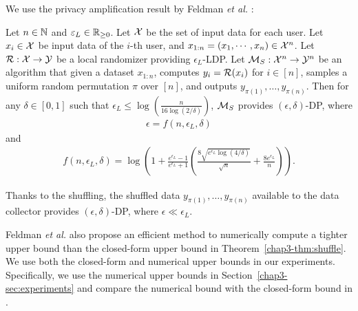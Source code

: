 We use the privacy amplification result by Feldman \textit{et al.} \cite{Feldman_FOCS21}:
\begin{theorem}  \label{chap3-thm:shuffle}
Let $n \in \mathbb{N}$ and $\varepsilon_L \in \mathbb{R}_{\ge0}$. 
Let $\mathcal{X}$ be the set of input data for each user. 
Let $x_i \in \mathcal{X}$ be input data of the $i$-th user, and 
$x_{1:n} = (x_1, \cdots, x_n) \in \mathcal{X}^n$. 
Let $\mathcal{R}: \mathcal{X} \rightarrow \mathcal{Y}$ be a local randomizer providing $\epsilon_L$-LDP. 
Let $\mathcal{M}_S: \mathcal{X}^n \rightarrow \mathcal{Y}^n$ be an algorithm that given a dataset $x_{1:n}$, computes $y_i = \mathcal{R}(x_i)$ for $i \in [n]$, samples a uniform random permutation $\pi$ over $[n]$, and outputs $y_{\pi(1)}, \ldots, y_{\pi(n)}$. 
Then for any $\delta \in [0,1]$ such that $\epsilon_L \leq \log (\frac{n}{16 \log (2/\delta)})$, $\mathcal{M}_S$ provides $(\epsilon, \delta)$-DP, where
\begin{align}
\epsilon = f(n, \epsilon_L, \delta)
\label{chap3-eq:shuffle_epsilon_f}
\end{align}
and 
\begin{align}
f(n, \epsilon_L, \delta) = \log \left( 1 + \frac{e^{\epsilon_L}-1}{e^{\epsilon_L}+1} \left( \frac{8\sqrt{e^{\epsilon_L} \log(4/\delta)}}{\sqrt{n}} + \frac{8 e^{\epsilon_L}}{n} \right) \right).
\label{chap3-eq:shuffle_epsilon}
\end{align}
\end{theorem}
Thanks to the shuffling, the shuffled data $y_{\pi(1)}, \ldots, y_{\pi(n)}$ available to the data collector provides $(\epsilon, \delta)$-DP, where $\epsilon \ll \epsilon_L$. 

Feldman \textit{et al.} \cite{Feldman_FOCS21} also propose an efficient method to numerically compute a tighter upper bound than the closed-form upper bound in Theorem~\ref{chap3-thm:shuffle}. 
We use both the closed-form and numerical upper bounds in our experiments. 
Specifically, we use the numerical upper bounds in Section~\ref{chap3-sec:experiments} and compare the numerical bound with the closed-form bound in 
. 

